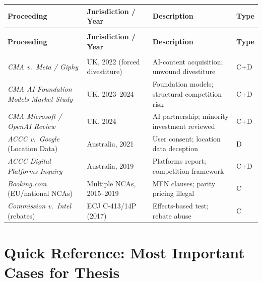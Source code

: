 \documentclass[12pt, letterpaper]{article}
\begin{document}
\begin{longtable}{@{} >{\small\raggedright\arraybackslash}p{2.0in}
                      >{\small\raggedright\arraybackslash}p{1.6in}
                      >{\small\raggedright\arraybackslash}p{1.9in}
                      >{\small\centering\arraybackslash}p{0.4in} @{}}
\toprule
\textbf{Proceeding} & \textbf{Jurisdiction / Year} & \textbf{Description} & \textbf{Type} \\
\midrule
\endfirsthead
\multicolumn{4}{l}{\small\textit{(continued)}} \\
\toprule
\textbf{Proceeding} & \textbf{Jurisdiction / Year} & \textbf{Description} & \textbf{Type} \\
\midrule
\endhead
\midrule\multicolumn{4}{r}{\small\textit{continued\ldots}}\\ \endfoot
\bottomrule\endlastfoot

\textit{CMA v.\ Meta / Giphy}
  & UK, 2022 (forced divestiture)
  & AI-content acquisition; unwound divestiture
  & C+D \\[4pt]

\textit{CMA AI Foundation Models Market Study}
  & UK, 2023--2024
  & Foundation models; structural competition risk
  & C+D \\[4pt]

\textit{CMA Microsoft / OpenAI Review}
  & UK, 2024
  & AI partnership; minority investment reviewed
  & C+D \\[4pt]

\textit{ACCC v.\ Google} (Location Data)
  & Australia, 2021
  & User consent; location data deception
  & D \\[4pt]

\textit{ACCC Digital Platforms Inquiry}
  & Australia, 2019
  & Platforms report; competition framework
  & C+D \\[4pt]

\textit{Booking.com} (EU/national NCAs)
  & Multiple NCAs, 2015--2019
  & MFN clauses; parity pricing illegal
  & C \\[4pt]

\textit{Commission v.\ Intel} (rebates)
  & ECJ C-413/14P (2017)
  & Effects-based test; rebate abuse
  & C \\

\end{longtable}

\section*{Quick Reference: Most Important Cases for Thesis}
\end{document}
